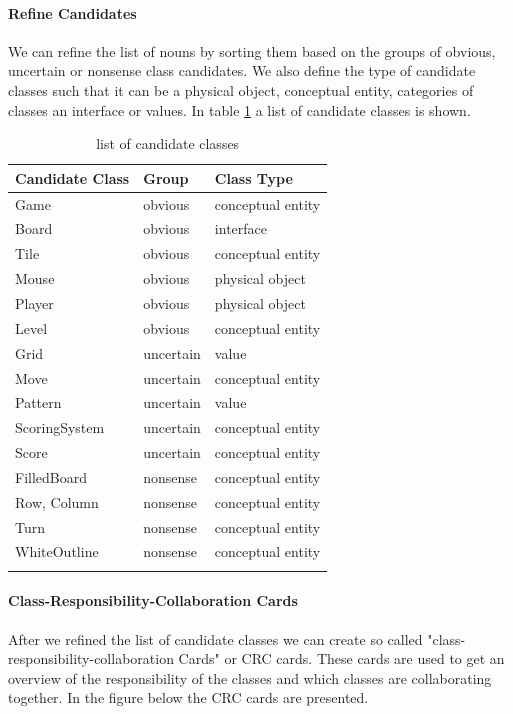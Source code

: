 \documentclass{article}
\begin{document}
\paragraph{Refine Candidates} We can refine the list of nouns by sorting them based on the groups of obvious, uncertain or nonsense class candidates. We also define the type of candidate classes such that it can be a physical object, conceptual entity, categories of classes an interface or values. In table \ref{table:ListCandidateClasses} a list of candidate classes is shown.

\begin{center}
    \begin{longtable}{ | p{1in} | p{1in} | p{2in} |}
    \hline
    \rowcolor{Gray}
    Candidate Class & Group & Class Type \\ \hline
	Game & obvious & conceptual entity \\ \hline
	Board & obvious & interface \\ \hline
	Tile & obvious & conceptual entity \\ \hline
	Mouse & obvious & physical object \\ \hline
	Player & obvious & physical object \\ \hline
	Level & obvious & conceptual entity \\ \hline
	Grid & uncertain & value \\ \hline
	Move & uncertain & conceptual entity \\ \hline
	Pattern & uncertain & value \\ \hline
	ScoringSystem & uncertain & conceptual entity \\ \hline
	Score & uncertain & conceptual entity \\ \hline
	FilledBoard & nonsense & conceptual entity \\ \hline
	Row, Column & nonsense & conceptual entity \\ \hline
	Turn & nonsense & conceptual entity \\ \hline
	WhiteOutline & nonsense & conceptual entity \\ \hline

	\caption{list of candidate classes}\label{table:ListCandidateClasses}
    \end{longtable}
\end{center}


\paragraph{Class-Responsibility-Collaboration Cards} After we refined the list of candidate classes we can create so called "class-responsibility-collaboration Cards" or CRC cards. These cards are used to get an overview of the responsibility of the classes and which classes are collaborating together. In the figure below the CRC cards are presented.
\end{document}
